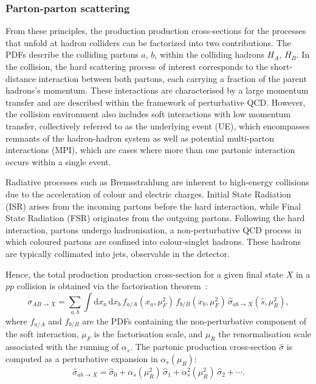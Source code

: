 \subsubsection*{Parton-parton scattering}
\label{subsubsec:proton}
From these principles, the production production cross-sections for the processes that unfold at hadron colliders can be factorized into two contributions. The PDFs describe the colliding partons $a$, $b$, within the colliding hadrons $H_{A}$, $H_{B}$. In the collision, the hard scattering process of interest corresponds to the short-distance interaction between both partons, each carrying a fraction of the parent hadrons's momentum. These interactions are characterised by a large momentum transfer and are described within the framework of perturbative QCD. However, the collision environment also includes soft interactions with low momentum transfer, collectively referred to as the underlying event (UE), which encompasses remnants of the hadron-hadron system as well as potential multi-parton interactions (MPI), which are cases where more than one partonic interaction occurs within a single event.

Radiative processes such as Bremsstrahlung are inherent to high-energy collisions due to the acceleration of colour and electric charges. Initial State Radiation (ISR) arises from the incoming partons before the hard interaction, while Final State Radiation (FSR) originates from the outgoing partons. Following the hard interaction, partons undergo hadronisation, a non-perturbative QCD process in which coloured partons are confined into colour-singlet hadrons. These hadrons are typically collimated into jets, observable in the detector.

Hence, the total production production cross-section for a given final state $X$ in a $pp$ collision is obtained via the factorisation theorem~\cite{fact_them,collins2004factorizationhardprocessesqcd}:
\begin{equation}
\sigma_{AB \to X} = \sum_{a,b} \int \mathrm{d}x_a \, \mathrm{d}x_b \, f_{a/A}(x_a, \mu_F^2) \, f_{b/B}(x_b, \mu_F^2) \, \hat{\sigma}_{ab \to X}(\hat{s}, \mu_R^2),
\end{equation}
where $f_{a/A}$ and $f_{b/B}$ are the PDFs containing the non-perturbative component of the soft interaction, $\mu_F$ is the factorisation scale, and $\mu_R$ the renormalisation scale associated with the running of $\alpha_s$. The partonic production cross-section $\hat{\sigma}$ is computed as a perturbative expansion in $\alpha_s(\mu_R)$:
\begin{equation}
\hat{\sigma}_{ab \to X} = \hat{\sigma}_0 + \alpha_s(\mu_R^2)\, \hat{\sigma}_1 + \alpha_s^2(\mu_R^2)\, \hat{\sigma}_2 + \cdots.
\label{running}
\end{equation}

